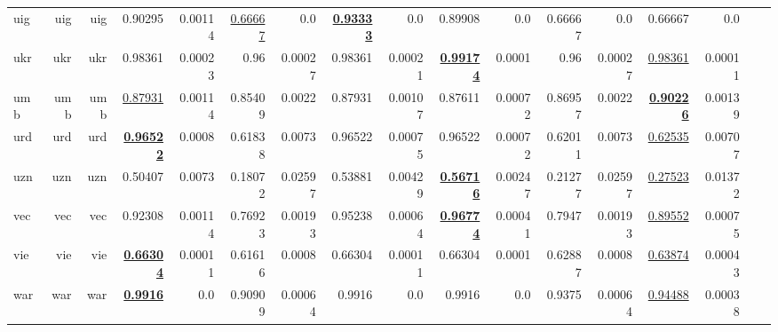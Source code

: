 \documentclass[11pt]{article}
\begin{document}
\begin{table*}[h]
{\begin{tabular}{lrrrrrrrrrrrrrrrr}
uig         & uig         & uig         & 0.90295         & 0.00114         & \underline{0.66667}         & 0.0         & \textbf{\underline{0.93333}}         & 0.0         & 0.89908         & 0.0         & 0.66667         & 0.0         & 0.66667         & 0.0         \\
ukr         & ukr         & ukr         & 0.98361         & 0.00023         & 0.96         & 0.00027         & 0.98361         & 0.00021         & \textbf{\underline{0.99174}}         & 0.0001         & 0.96         & 0.00027         & \underline{0.98361}         & 0.00011         \\
umb         & umb         & umb         & \underline{0.87931}         & 0.00114         & 0.85409         & 0.0022         & 0.87931         & 0.00107         & 0.87611         & 0.00072         & 0.86957         & 0.0022         & \textbf{\underline{0.90226}}         & 0.00139         \\
urd         & urd         & urd         & \textbf{\underline{0.96522}}         & 0.0008         & 0.61838         & 0.0073         & 0.96522         & 0.00075         & 0.96522         & 0.00072         & 0.62011         & 0.0073         & \underline{0.62535}         & 0.00707         \\
uzn         & uzn         & uzn         & 0.50407         & 0.0073         & 0.18072         & 0.02597         & 0.53881         & 0.00429         & \textbf{\underline{0.56716}}         & 0.00247         & 0.21277         & 0.02597         & \underline{0.27523}         & 0.01372         \\
vec         & vec         & vec         & 0.92308         & 0.00114         & 0.76923         & 0.00193         & 0.95238         & 0.00064         & \textbf{\underline{0.96774}}         & 0.00041         & 0.7947         & 0.00193         & \underline{0.89552}         & 0.00075         \\
vie         & vie         & vie         & \textbf{\underline{0.66304}}         & 0.00011         & 0.61616         & 0.0008         & 0.66304         & 0.00011         & 0.66304         & 0.0001         & 0.62887         & 0.0008         & \underline{0.63874}         & 0.00043         \\
war         & war         & war         & \textbf{\underline{0.9916}}         & 0.0         & 0.90909         & 0.00064         & 0.9916         & 0.0         & 0.9916         & 0.0         & 0.9375         & 0.00064         & \underline{0.94488}         & 0.00038         \\

\end{tabular}}
\end{table*}
\end{document}
